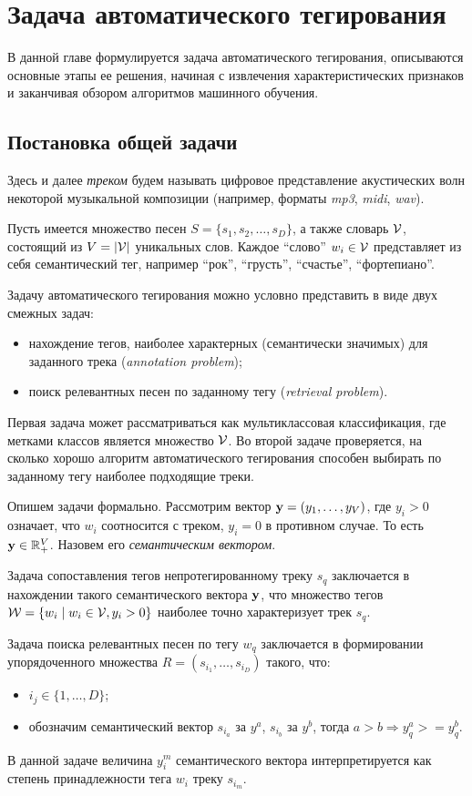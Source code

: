 \chapter{Задача автоматического тегирования}
\label{chapter1}

В данной главе формулируется задача автоматического тегирования, описываются основные этапы ее решения, 
начиная с извлечения характеристических признаков и заканчивая обзором алгоритмов машинного обучения.

\section{Постановка общей задачи}
Здесь и далее \emph{треком} будем называть цифровое представление акустических волн некоторой музыкальной композиции (например, форматы \emph{mp3}, \emph{midi}, \emph{wav}).

Пусть имеется множество песен $S = \{s_1, s_2, \ldots, s_D \}$, а также словарь $ \mathcal{V} $, состоящий из $V = |\mathcal{V}| $ уникальных слов. 
Каждое ``слово'' $w_i \in \mathcal{V}$ представляет из себя семантический тег, например ``рок'', ``грусть'', ``счастье'', ``фортепиано''.

Задачу автоматического тегирования можно условно представить в виде двух смежных задач: 
\begin{itemize}
 \item нахождение тегов, наиболее характерных (семантически значимых) для заданного трека (\emph{annotation problem});
 \item поиск релевантных песен по заданному тегу (\emph{retrieval problem}).
\end{itemize}

Первая задача может рассматриваться как мультиклассовая классификация, где метками классов является множество $\mathcal{V}$.
Во второй задаче проверяется, на сколько хорошо алгоритм автоматического тегирования способен выбирать по заданному тегу наиболее подходящие треки.

Опишем задачи формально.
Рассмотрим вектор $\mathbf{y} = (y_1, \ldots, y_V)$, где $y_i > 0$ означает, что $w_i$ соотносится с треком, $y_i = 0$ в противном случае. То есть $\mathbf{y} \in \mathbb{R}^{V}_{+}$.
Назовем его \emph{семантическим вектором}.

Задача сопоставления тегов непротегированному треку $s_q$ заключается в нахождении такого семантического вектора $\mathbf{y}$, 
что множество тегов $\mathcal{W} = \{w_i \mid w_i \in \mathcal{V}, y_i > 0\}$ наиболее точно характеризует трек $s_q$.

Задача поиска релевантных песен по тегу $w_q$ заключается в формировании упорядоченного множества $R = (s_{i_1}, \ldots, s_{i_D})$ такого, что:
\begin{itemize}
 \item $i_j \in \{1, \ldots, D \}$;
 \item обозначим семантический вектор $s_{i_a}$ за $y^a$, $s_{i_b}$ \ld за $y^b$, тогда $a > b \Rightarrow y^a_q >= y^b_q $.
\end{itemize}
В данной задаче величина $y^m_i$ семантического вектора интерпретируется как степень принадлежности тега $w_i$ треку $s_{i_m}$. 
 
